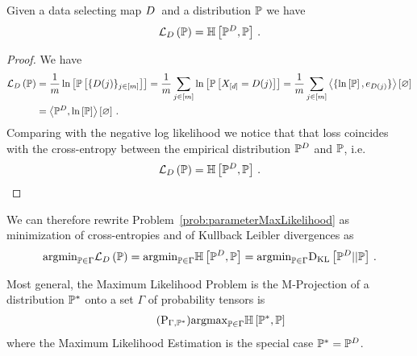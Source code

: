 \begin{theorem}\label{the:lossCentropy}
	Given a data selecting map $D$ and a distribution $\mathbb{P}$ we have
	\begin{align}
		\lossof{\probtensor} =  \centropyof{\empdistribution}{\probtensor} \, . %
	\end{align}
\end{theorem}
\begin{proof}
	We have
	\begin{align*}
		\lossof{\probtensor} 
		& = \frac{1}{\datanum} \lnof{\probof{\data}} 
		= \frac{1}{\datanum} \sum_{\datain} \lnof{\probof{\shortcatvariables =\datamap(\dataindex)}} 
		= \frac{1}{\datanum} \sum_{\datain} \contraction{\{\lnof{\probtensor},\onehotmapof{\datamap(\dataindex)}\}} \\ 
		& = \sbcontraction{\empdistribution,\lnof{\probtensor}} \, .
	\end{align*}
	Comparing with the negative log likelihood we notice that that loss coincides with the cross-entropy between the empirical distribution $\mathbb{P}^{D}$ and $\mathbb{P}$, i.e.
		\[ \mathcal{L}_{D}\left(\mathbb{P}\right) = \mathbb{H}\left[\mathbb{P}^{D},\mathbb{P}\right] \, . \]
\end{proof}



We can therefore rewrite Problem~\ref{prob:parameterMaxLikelihood} as minimization of cross-entropies and of Kullback Leibler divergences as
\begin{align*}
	\mathrm{argmin}_{\mathbb{P}\in\Gamma} \mathcal{L}_{D}\left(\mathbb{P}\right) 
	= \mathrm{argmin}_{\mathbb{P}\in\Gamma} \mathbb{H}\left[\mathbb{P}^{D},\mathbb{P}\right] 
	= \mathrm{argmin}_{\mathbb{P}\in\Gamma} \mathrm{D}_{\mathrm{KL}}\left[ \mathbb{P}^{D} || \mathbb{P} \right] \, .
\end{align*}
	


Most general, the Maximum Likelihood Problem is the M-Projection of a distribution $\mathbb{P}^*$ onto a set $\Gamma$ of probability tensors is
\begin{align}\tag{$\mathrm{P}_{\Gamma, \gendistribution}$}\label{prob:mProjection}
	\argmax_{\probtensor\in\Gamma} \centropyof{\gendistribution}{\probtensor} 
\end{align}
where the Maximum Likelihood Estimation is the special case $\mathbb{P}^*=\mathbb{P}^{D}$.


